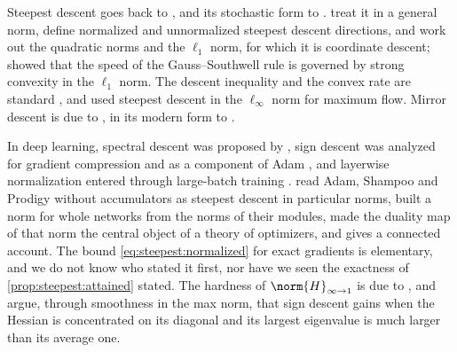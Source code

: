 \begin{refsection}
\notesandrefs

Steepest descent goes back to \textcite{Cauchy1847}, and its stochastic form to \textcite{RobbinsMonro1951}. \Textcite[Section~9.4]{BoydVandenberghe2004} treat it in a general norm, define normalized and unnormalized steepest descent directions, and work out the quadratic norms and the $\ell_1$ norm, for which it is coordinate descent; \textcite{NutiniEtAl2015} showed that the speed of the Gauss--Southwell rule is governed by strong convexity in the $\ell_1$ norm. The descent inequality and the convex rate are standard \parencite{Nesterov2018}, and \textcite{KelnerEtAl2014} used steepest descent in the $\ell_\infty$ norm for maximum flow. Mirror descent is due to \textcite{NemirovskyYudin1983}, in its modern form to \textcite{BeckTeboulle2003}.

In deep learning, spectral descent was proposed by \textcite{CarlsonEtAl2015}, sign descent was analyzed for gradient compression \parencite{BernsteinEtAl2018} and as a component of Adam \parencite{BallesHennig2018}, and layerwise normalization entered through large-batch training \parencite{YouGitmanGinsburg2017,YouEtAl2020}. \Textcite{BernsteinNewhouse2024} read Adam, Shampoo and Prodigy without accumulators as steepest descent in particular norms, \textcite{LargeEtAl2024} built a norm for whole networks from the norms of their modules, \textcite{BernsteinNewhouse2025} made the duality map of that norm the central object of a theory of optimizers, and \textcite{Newhouse2025} gives a connected account. The bound \eqref{eq:steepest:normalized} for exact gradients is elementary, and we do not know who stated it first, nor have we seen the exactness of \cref{prop:steepest:attained} stated. The hardness of $\norm{H}_{\infty\to1}$ is due to \textcite{Rohn2000}, and \textcite{BallesPedregosaLeRoux2020} argue, through smoothness in the max norm, that sign descent gains when the Hessian is concentrated on its diagonal and its largest eigenvalue is much larger than its average one.


\end{refsection}
